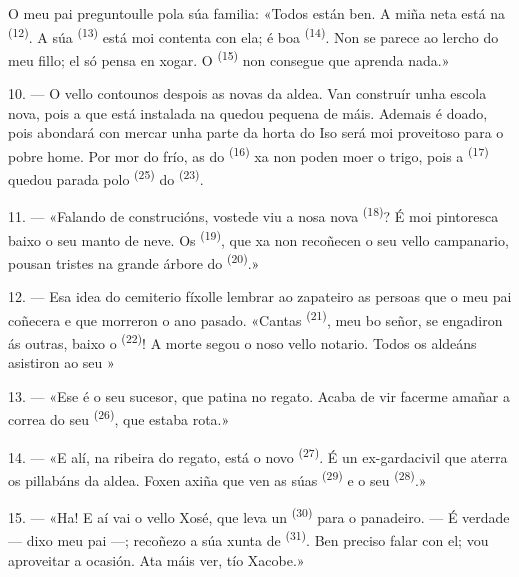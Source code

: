 O meu pai preguntoulle pola súa familia: «Todos están ben. A miña neta está na
 \textsuperscript{(12)}. A súa 
\textsuperscript{(13)} está moi contenta con ela; é boa 
\textsuperscript{(14)}. Non se parece ao lercho do meu fillo; el só pensa en xogar. O
 \textsuperscript{(15)} non consegue que aprenda nada.»

\VUsaut{3.0mm}
\VUsaut{3.0mm}

10. --- O vello contounos despois as novas da aldea. Van construír unha escola nova, pois a
que está instalada na  quedou pequena de máis. Ademais é doado, pois
abondará con mercar unha parte da horta do  Iso será moi proveitoso para o
pobre home. Por mor do frío, as  do
 \textsuperscript{(16)} xa non poden moer o trigo, pois a
 \textsuperscript{(17)} quedou parada polo 
\textsuperscript{(25)} do  \textsuperscript{(23)}.

11. --- «Falando de construcións, vostede viu a nosa nova 
\textsuperscript{(18)}? É moi pintoresca baixo o seu manto de neve. Os
 \textsuperscript{(19)}, que xa non recoñecen o seu vello campanario,
pousan tristes na grande árbore do  \textsuperscript{(20)}.»

12. --- Esa idea do cemiterio fíxolle lembrar ao zapateiro as persoas que o meu pai coñecera e
que morreron o ano pasado. «Cantas  \textsuperscript{(21)}, meu bo señor,
se engadiron ás outras, baixo o  \textsuperscript{(22)}! A morte segou o noso
vello notario. Todos os aldeáns asistiron ao seu »

13. --- «Ese é o seu sucesor, que patina no regato. Acaba de vir facerme amañar a correa do
seu  \textsuperscript{(26)}, que estaba rota.»

14. --- «E alí, na ribeira do regato, está o novo  \textsuperscript{(27)}.
É un ex-gardacivil que aterra os pillabáns da aldea. Foxen axiña que ven as súas
 \textsuperscript{(29)} e o seu  \textsuperscript{(28)}.»

15. --- «Ha! E aí vai o vello Xosé, que leva un 
\textsuperscript{(30)} para o panadeiro. --- É verdade --- dixo meu pai ---; recoñezo a súa
xunta de  \textsuperscript{(31)}. Ben preciso falar con el; vou aproveitar a
ocasión. Ata máis ver, tío Xacobe.»

